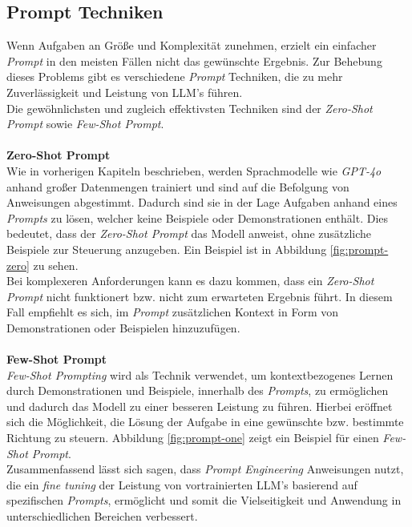 \subsection{Prompt Techniken}
Wenn Aufgaben an Größe und Komplexität zunehmen, erzielt ein einfacher \textit{Prompt} in den meisten Fällen nicht das gewünschte Ergebnis. Zur Behebung dieses Problems gibt es verschiedene \textit{Prompt} Techniken, die zu mehr Zuverlässigkeit und Leistung von LLM's führen.\\ Die gewöhnlichsten und zugleich effektivsten Techniken sind der \textit{Zero-Shot Prompt} sowie \textit{Few-Shot Prompt}. \cite*{PromptEngineeringGuide}\\\\
\textbf{Zero-Shot Prompt}\\[0.2cm]
Wie in vorherigen Kapiteln beschrieben, werden Sprachmodelle wie \textit{GPT-4o} anhand großer Datenmengen trainiert und sind auf die Befolgung von Anweisungen abgestimmt. Dadurch sind sie in der Lage Aufgaben anhand eines \textit{Prompts} zu lösen, welcher keine Beispiele oder Demonstrationen enthält. Dies bedeutet, dass der \textit{Zero-Shot Prompt} das Modell anweist, ohne zusätzliche Beispiele zur Steuerung anzugeben. Ein Beispiel ist in Abbildung \ref{fig:prompt-zero} zu sehen.\\Bei komplexeren Anforderungen kann es dazu kommen, dass ein \textit{Zero-Shot Prompt} nicht funktionert bzw. nicht zum erwarteten Ergebnis führt. In diesem Fall empfiehlt es sich, im \textit{Prompt} zusätzlichen Kontext in Form von Demonstrationen oder Beispielen hinzuzufügen. \cite{PromptEngineeringGuide}\\\\
\textbf{Few-Shot Prompt}\\[0.2cm]
\textit{Few-Shot Prompting} wird als Technik verwendet, um kontextbezogenes Lernen durch Demonstrationen und Beispiele, innerhalb des \textit{Prompts}, zu ermöglichen und dadurch das Modell zu einer besseren Leistung zu führen. Hierbei eröffnet sich die Möglichkeit, die Lösung der Aufgabe in eine gewünschte bzw. bestimmte Richtung zu steuern. Abbildung \ref{fig:prompt-one} zeigt ein Beispiel für einen \textit{Few-Shot Prompt}. \\
Zusammenfassend lässt sich sagen, dass \textit{Prompt Engineering} Anweisungen nutzt, die ein \textit{fine tuning} der Leistung von vortrainierten LLM's basierend auf spezifischen \textit{Prompts}, ermöglicht und somit die Vielseitigkeit und Anwendung in unterschiedlichen Bereichen verbessert. \cite*{sahooSystematicSurveyPrompt2024}

